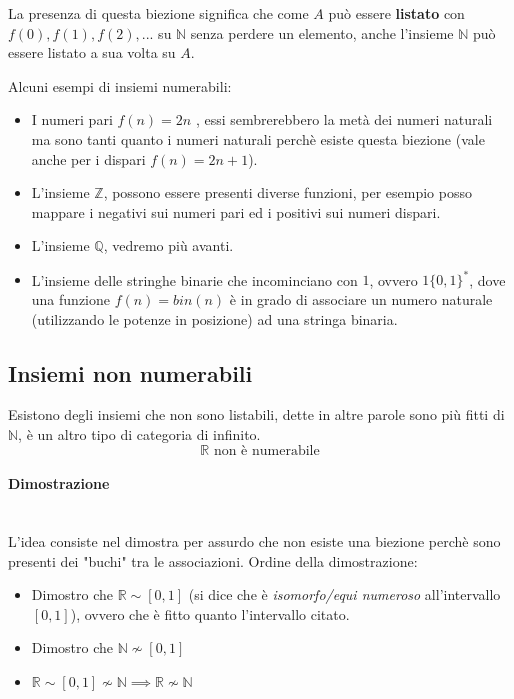 \documentclass{article}
\begin{document}
La presenza di questa biezione significa che come $A$ può essere \textbf{listato} con
$f(0),f(1),f(2),...$ su $\mathbb{N}$ senza perdere un elemento, anche l'insieme $\mathbb{N}$ può essere
listato a sua volta su $A$.

Alcuni esempi di insiemi numerabili:
\begin{itemize}
    \item I numeri pari $f(n)=2n$ , essi sembrerebbero la metà dei numeri naturali ma sono tanti quanto i numeri
          naturali perchè esiste questa biezione (vale anche per i dispari $f(n)=2n+1$).
    \item L'insieme $\mathbb{Z}$, possono essere presenti diverse funzioni, per esempio
          posso mappare i negativi sui numeri pari ed i positivi sui numeri dispari.
    \item L'insieme $\mathbb{Q}$, vedremo più avanti.
    \item L'insieme delle stringhe binarie che incominciano con $1$, ovvero $1\{0,1\}^*$,
          dove una funzione $f(n)=bin(n)$ è in grado di associare un numero naturale (utilizzando
          le potenze in posizione) ad una stringa binaria.
\end{itemize}

\subsection{Insiemi non numerabili}
Esistono degli insiemi che non sono listabili, dette in altre parole sono più fitti di $\mathbb{N}$,
è un altro tipo di categoria di infinito.
$$\mathbb{R}\text{ non è numerabile}$$
\paragraph{Dimostrazione}\mbox{}\\L'idea consiste nel dimostra per assurdo che non esiste una biezione
perchè sono presenti dei "buchi" tra le associazioni. Ordine della dimostrazione:
\begin{itemize}
    \item Dimostro che $\mathbb{R}\sim[0,1]$ (si dice che è \textit{isomorfo/equi numeroso} all'intervallo $[0,1]$),
          ovvero che è fitto quanto l'intervallo citato.
    \item Dimostro che $\mathbb{N}\nsim[0,1]$
    \item $\mathbb{R}\sim[0,1]\nsim\mathbb{N}\implies\mathbb{R}\nsim\mathbb{N}$
\end{itemize}
\end{document}
